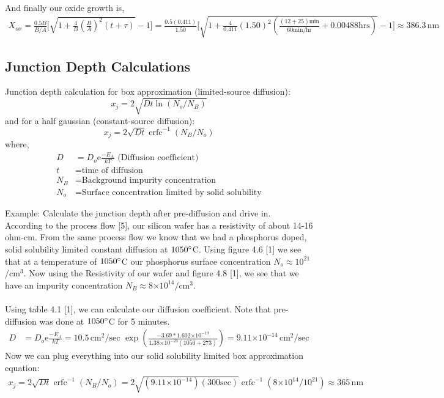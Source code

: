 \documentclass{article}
\newcommand{\me}{\mathrm{e}}
\providecommand{\e}[1]{\ensuremath{\times 10^{#1}}}
\DeclareMathOperator\erfc{erfc}
\begin{document}
And finally our oxide growth is,
\begin{align*}
X_{ox} = \frac{0.5B}{B/A}\Big[\sqrt{1 + \frac{4}{B}(\frac{B}{A})^2(t + \tau)} - 1\Big] = \frac{0.5 (0.411)}{1.50}\Big[\sqrt{1 + \frac{4}{0.411}(1.50)^2(\frac{(12 + 25)\text{min}}{60\text{min/hr}} + 0.00488 \text{hrs})} - 1\Big] \approx 386.3 \, \text{nm}
\end{align*}

\subsection{Junction Depth Calculations}
\label{sec:jdepth}
Junction depth calculation for box approximation (limited-source diffusion):
\begin{equation}
x_j = 2\sqrt{Dt \ln{(N_o/N_B)}}
\end{equation}
and for a half gaussian (constant-source diffusion):
\begin{equation}
x_j = 2\sqrt{Dt}\erfc^{-1}{(N_B/N_o)}
\end{equation}
where,
\begin{align*}
D &= D_o\me{\frac{-E_A}{kT}} \,\,\text{(Diffusion coefficient)} \\ 
t &= \text{time of diffusion} \\
N_B &= \text{Background impurity concentration} \\ 
N_o &= \text{Surface concentration limited by solid solubility}
\end{align*}

Example: Calculate the junction depth after pre-diffusion and drive in. \\
According to the process flow [5], our silicon wafer has a resistivity of about 14-16 ohm-cm. From the same process flow we know that we had a phosphorus doped, solid solubility limited constant diffusion at $1050\degree$C. Using figure 4.6 [1] we see that at a temperature of $1050\degree$C our phosphorus surface concentration $N_o \approx 10^{21}$/$\text{cm}^3$. Now using the Resistivity of our wafer and figure 4.8 [1], we see that we have an impurity concentration $N_B \approx 8\e{14}/\text{cm}^3$. \\ \\
Using table 4.1 [1], we can calculate our diffusion coefficient. Note that pre-diffusion was done at $1050\degree$C for 5 minutes.
\begin{align*}
D &= D_o\me{\frac{-E_A}{kT}} = 10.5 \,\text{cm}^2/\text{sec}\,\, \exp{(\frac{-3.69*1.602\e{-19}}{1.38\e{-23}(1050 + 273)})} = 9.11\e{-14} \, \text{cm}^2/\text{sec}
\end{align*}
Now we can plug everything into our solid solubility limited box approximation equation:
\begin{align*}
x_j = 2\sqrt{Dt}\erfc^{-1}{(N_B/N_o)} = 2\sqrt{(9.11\e{-14})(300\text{sec})} \erfc^{-1}{(8\e{14}/10^{21})} \approx 365 \,\text{nm}
\end{align*}
\end{document}
